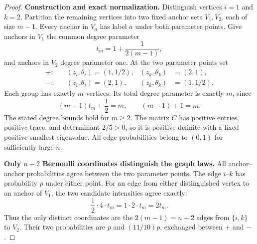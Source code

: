 \begin{proof}
\textbf{Construction and exact normalization.}
Distinguish vertices \(i=1\) and \(k=2\). Partition the remaining vertices
into two fixed anchor sets \(V_1,V_2\), each of size \(m-1\). Every anchor
in \(V_a\) has label \(a\) under both parameter points. Give anchors in
\(V_1\) the common degree parameter
\[
 t_m=1+\frac1{2(m-1)},
\]
and anchors in \(V_2\) degree parameter one. At the two parameter points set
\begin{equation}
 \begin{aligned}
 +:\quad &(z_i,\theta_i)=(1,1/2),
          & (z_k,\theta_k)&=(2,1),\\
 -:\quad &(z_i,\theta_i)=(2,1),
          & (z_k,\theta_k)&=(1,1/2).
 \end{aligned}
 \label{eq:imposs-two-points}
\end{equation}
Each group has exactly \(m\) vertices. Its total degree parameter is exactly
\(m\), since
\[
 (m-1)t_m+\frac12=m,
 \qquad (m-1)+1=m.
\]
The stated degree bounds hold for \(m\ge2\). The matrix \(C\) has positive
entries, positive trace, and determinant \(2/5>0\), so it is positive
definite with a fixed positive smallest eigenvalue. All edge probabilities
belong to \((0,1)\) for sufficiently large \(n\).

\medskip
\textbf{Only \(n-2\) Bernoulli coordinates distinguish the graph laws.}
All anchor--anchor probabilities agree between the two parameter points.
The edge \(i\)--\(k\) has probability \(p\) under either point. For an edge
from either distinguished vertex to an anchor of \(V_1\), the two candidate
intensities agree exactly:
\[
 \frac12\cdot4\cdot t_m=1\cdot2\cdot t_m=2t_m.
\]
Thus the only distinct coordinates are the \(2(m-1)=n-2\) edges from
\(\{i,k\}\) to \(V_2\). Their two probabilities are \(p\) and
\((11/10)p\), exchanged between \(+\) and \(-\).


\end{proof}
